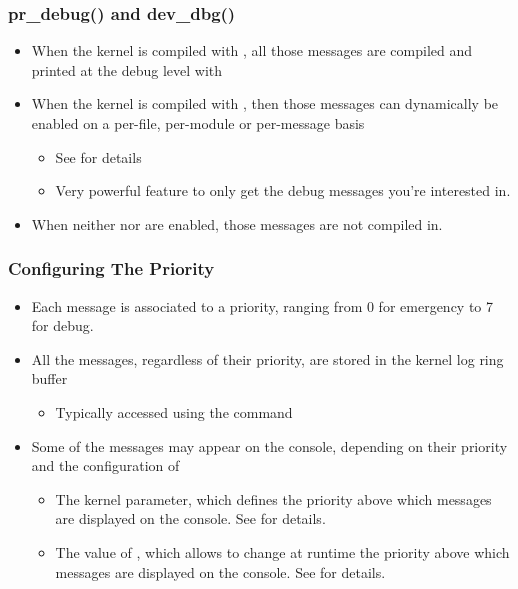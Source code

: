 \begin{frame}
  \frametitle{pr\_debug() and dev\_dbg()}
  \begin{itemize}
  \item When the kernel is compiled with , all
    those messages are compiled and printed at the debug level with
  \item When the kernel is compiled with ,
    then those messages can dynamically be enabled on a per-file,
    per-module or per-message basis
    \begin{itemize}
    \item See  for details
    \item Very powerful feature to only get the debug messages you're
      interested in.
    \end{itemize}
  \item When neither  nor
     are enabled, those messages are not
    compiled in.
  \end{itemize}
\end{frame}

\begin{frame}
  \frametitle{Configuring The Priority}
  \begin{itemize}
  \item Each message is associated to a priority, ranging from 0 for
    emergency to 7 for debug.
  \item All the messages, regardless of their priority, are stored in
    the kernel log ring buffer
    \begin{itemize}
    \item Typically accessed using the  command
    \end{itemize}
  \item Some of the messages may appear on the console, depending on
    their priority and the configuration of
    \begin{itemize}
    \item The  kernel parameter, which defines the
      priority above which messages are displayed on the console. See
       for details.
    \item The value of , which allows to
      change at runtime the priority above which messages are
      displayed on the console. See
       for details.
    \end{itemize}
  \end{itemize}
\end{frame}

